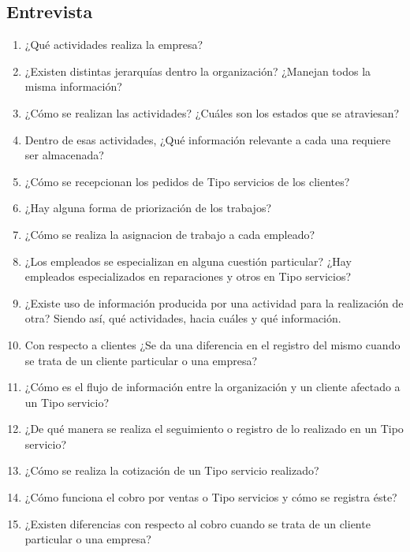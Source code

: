 \documentclass[12pt]{extarticle}
\begin{document}
    \begin{spacing}{1.2}


        \newcommand\OT{\textit{Orden de Trabajo}}
        \newcommand\OTs{\textit{Órdenes de Trabajo}}


    \section{Entrevista}
    \begin{enumerate}
        \item ¿Qué actividades realiza la empresa?
        \item ¿Existen distintas jerarquías dentro la organización? ¿Manejan todos la misma información?
        \item ¿Cómo se realizan las actividades? ¿Cuáles son los estados que se atraviesan?
        \item Dentro de esas actividades, ¿Qué información relevante a cada una requiere ser almacenada?
        \item ¿Cómo se recepcionan los pedidos de Tipo servicios de los clientes?
        \item ¿Hay alguna forma de priorización de los trabajos?
        \item ¿Cómo se realiza la asignacion de trabajo a cada empleado? 
        \item ¿Los empleados se especializan en alguna cuestión particular? ¿Hay empleados especializados en reparaciones y otros en Tipo servicios? 
        \item ¿Existe uso de información producida por una actividad para la realización de otra? Siendo así, qué actividades, hacia cuáles y qué información.
        \item Con respecto a clientes ¿Se da una diferencia en el registro del mismo cuando se trata de un cliente particular o una empresa?
        \item ¿Cómo es el flujo de información entre la organización y un cliente afectado a un Tipo servicio?
        \item ¿De qué manera se realiza el seguimiento o registro de lo realizado en un Tipo servicio?
        \item ¿Cómo se realiza la cotización de un Tipo servicio realizado?
        \item ¿Cómo funciona el cobro por ventas o Tipo servicios y cómo se registra éste?
        \item ¿Existen diferencias con respecto al cobro cuando se trata de un cliente particular o una empresa?

\end{enumerate}
\end{spacing}
\end{document}
